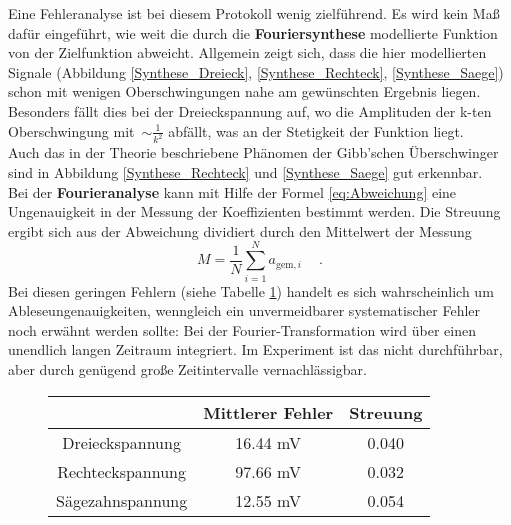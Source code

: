 Eine Fehleranalyse ist bei diesem Protokoll wenig zielführend. Es wird kein Maß dafür eingeführt, wie weit die durch die \textbf{Fouriersynthese} modellierte Funktion von der Zielfunktion abweicht. Allgemein zeigt sich, dass die hier modellierten Signale (Abbildung \ref{Synthese_Dreieck}, \ref{Synthese_Rechteck}, \ref{Synthese_Saege}) schon mit wenigen Oberschwingungen nahe am gewünschten Ergebnis liegen. Besonders fällt dies bei der Dreieckspannung auf, wo die Amplituden der k-ten Oberschwingung mit~$\sim \frac{1}{k^2}$ abfällt, was an der Stetigkeit der Funktion liegt. \\
Auch das in der Theorie beschriebene Phänomen der Gibb'schen Überschwinger sind in Abbildung \ref{Synthese_Rechteck} und \ref{Synthese_Saege} gut erkennbar. \\
Bei der \textbf{Fourieranalyse} kann mit Hilfe der Formel \eqref{eq:Abweichung} eine Ungenauigkeit in der Messung der Koeffizienten bestimmt werden. Die Streuung ergibt sich aus der Abweichung dividiert durch den Mittelwert der Messung
\begin{equation}
M = \frac{1}{N}  \sum_{i=1}^{N}  a_{\text{gem},i}\ \quad.
\end{equation} 
Bei diesen geringen Fehlern (siehe Tabelle \ref{tab:Fehler}) handelt es sich wahrscheinlich um Ableseungenauigkeiten, wenngleich ein unvermeidbarer systematischer Fehler noch erwähnt werden sollte: Bei der Fourier-Transformation wird über einen unendlich langen Zeitraum integriert. Im Experiment ist das nicht durchführbar, aber durch genügend große Zeitintervalle vernachlässigbar.
\begin{figure}[h!]
	\centering
		\begin{tabular}{c|cc}
			 & Mittlerer Fehler & Streuung \\
			 \hline
			Dreieckspannung & 16.44 \si{\milli\volt} & 0.040 \\
			Rechteckspannung & 97.66 \si{\milli\volt} & 0.032 \\
			Sägezahnspannung & 12.55 \si{\milli\volt} & 0.054 \\
		\end{tabular}
		\label{tab:Fehler}
\end{figure}


